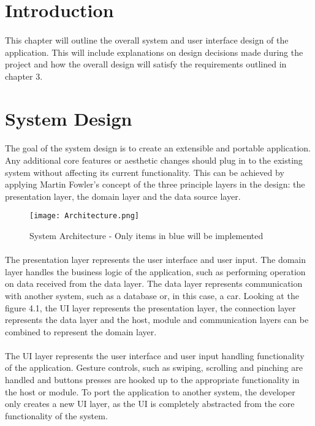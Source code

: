 \section{Introduction}
	\paragraph{}{
	This chapter will outline the overall system and user interface design of the application. This will include explanations on design decisions made during the project and how the overall design will satisfy the requirements outlined in chapter 3.
	}

\section{System Design}
	\paragraph{}{
	The goal of the system design is to create an extensible and portable application. Any additional core features or aesthetic changes should plug in to the existing system without affecting its current functionality. This can be achieved by applying Martin Fowler's concept of the three principle layers in the design: the presentation layer, the domain layer and the data source layer.
	}
	\begin{figure}[h]
		\begin{center}
			\texttt{[image: Architecture.png]}
			\caption{System Architecture - Only items in blue will be implemented}
		\end{center}
	\end{figure}
	\paragraph{}{
	The presentation layer represents the user interface and user input. The domain layer handles the business logic of the application, such as performing operation on data received from the data layer. The data layer represents communication with another system, such as a database or, in this case, a car. Looking at the figure 4.1, the UI layer represents the presentation layer, the connection layer represents the data layer and the host, module and communication layers can be combined to represent the domain layer.
		
	}
	\paragraph{}{
	The UI layer represents the user interface and user input handling functionality of the application. Gesture controls, such as swiping, scrolling and pinching are handled and buttons presses are hooked up to the appropriate functionality in the host or module. To port the application to another system, the developer only creates a new UI layer, as the UI is completely abstracted from the core functionality of the system.
	}
